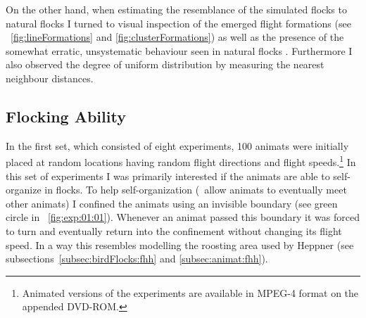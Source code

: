 On the other hand, when estimating the resemblance of the simulated flocks to natural flocks I turned to visual inspection of the emerged flight formations (see \figs~\ref{fig:lineFormations} and \ref{fig:clusterFormations}) as well as the presence of the somewhat erratic, unsystematic behaviour seen in natural flocks \cite{heppner:1990}.  Furthermore I also observed the degree of uniform distribution by measuring the nearest neighbour distances.

\subsection{Flocking Ability}
In the first set, which consisted of eight experiments, 100 animats were initially placed at random locations having random flight directions and flight speeds.\footnote{Animated versions of the experiments are available in MPEG-4 format on the appended DVD-ROM.} In this set of experiments I was primarily interested if the animats are able to self-organize in flocks. To help self-organization (\ie\ allow animats to eventually meet other animats) I confined the animats using an invisible boundary (see green circle in \fig~\ref{fig:exp:01:01}). Whenever an animat passed this boundary it was forced to turn and eventually return into the confinement without changing its flight speed. In a way this resembles modelling the roosting area used by Heppner  \cite{heppner:1990} (see subsections~\ref{subsec:birdFlocks:fhh} and \ref{subsec:animat:fhh}).

